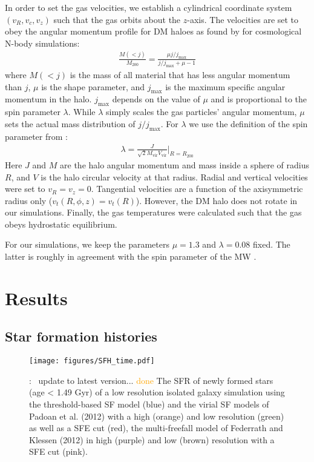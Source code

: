 \documentclass{aa}
\newcommand{\T}[1]{{\color{blue}{\bf T}:~ #1}}
\begin{document}
In order to set the gas velocities, we establish a cylindrical coordinate system $(v_R, v_c, v_z)$ such that the gas orbits about the $z$-axis. The velocities are set to obey the angular momentum profile for DM haloes as found by \cite{Bullock2001} for cosmological N-body simulations:
\begin{align}
\frac{M(< j)}{M_{200}} = \frac{\mu j/j_{\text{max}}}{j/j_{\text{max}} + \mu - 1}
\end{align}
where $M(< j)$ is the mass of all material that has less angular momentum than $j$, $\mu$ is the shape parameter, and $j_{\text{max}}$ is the maximum specific angular momentum in the halo. 
$j_{\text{max}}$ depends on the value of $\mu$ and is proportional to the spin parameter $\lambda$. While $\lambda$ simply scales the gas particles' angular
momentum, $\mu$ sets the actual mass distribution of $j/j_{\text{max}}$. For $\lambda$ we use the definition of the spin parameter from \cite{Bullock2001}:
\begin{align}
\lambda = \frac{J}{\sqrt{2} M_{\text{vir}} V_{\text{vir}}} \Bigg|_{R=R_{200}}
\end{align}
%
Here $J$ and $M$ are the halo angular momentum and mass
inside a sphere of radius $R$, and $V$ is the halo circular velocity at that radius. Radial and vertical velocities were set
to $v_R = v_z = 0$. Tangential velocities are a function of the
axisymmetric radius only ($v_t(R, \phi, z) = v_t(R)$). However,
the DM halo does not rotate in our simulations. Finally, the
gas temperatures were calculated such that the gas obeys
hydrostatic equilibrium.

For our simulations, we keep the parameters $\mu = 1.3$ and $\lambda=0.08$ fixed. The latter is roughly in agreement with the spin parameter of the MW \citep{Obreja2022,Obreja2023}.

\section{Results}

\subsection{Star formation histories}

\begin{figure}
\begin{center}
    \texttt{[image: figures/SFH\_time.pdf]}
    \caption{\T{update to latest version...} \textcolor{orange}{done} The SFR of newly formed stars (age < 1.49 Gyr) of a low resolution isolated galaxy simulation using the threshold-based SF model (blue) and the virial SF models of Padoan et al. (2012) with a high (orange) and low resolution (green) as well as a SFE cut (red), the multi-freefall model of Federrath and Klessen (2012) in high (purple) and low (brown) resolution with a SFE cut (pink).}
\end{center}
\end{figure}
\end{document}
